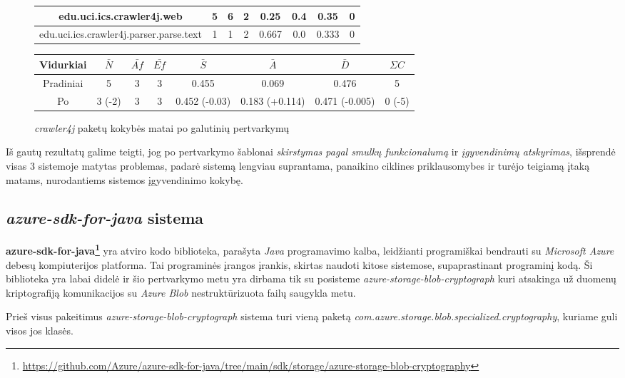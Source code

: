 \begin{figure}[H]
\begin{center}
\begin{tabular}{|c|c|c|c|c|c|c|c|}
        \hline
        edu.uci.ics.crawler4j.web & 5 & 6 & 2 & 0.25 & 0.4 & 0.35 & 0 \\
        \hline
        edu.uci.ics.crawler4j.parser.parse.text & 1 & 1 & 2 & 0.667 & 0.0 & 0.333 & 0 \\
        \hline
    \end{tabular}
    \begin{tabular}{|c|c|c|c|c|c|c|c|}
        \hline
        Vidurkiai & $\bar{N}$ & $\bar{Af}$ & $\bar{Ef}$ & $\bar{S}$ & $\bar{A}$ & $\bar{D}$ & $\Sigma C$ \\ [0.5ex]
        \hline\hline
        Pradiniai & 5 & 3 & 3 & 0.455 & 0.069 & 0.476 & 5\\
        \hline
        Po & \cellcolor{green!25} 3 (-2) & 3 & 3 & \cellcolor{green!24} 0.452 (-0.03) & \cellcolor{green!25} 0.183 (+0.114) & \cellcolor{green!25} 0.471 (-0.005) & \cellcolor{green!25} 0 (-5)\\
        \hline
    \end{tabular}
\end{center}
\caption{\textit{crawler4j} paketų kokybės matai po galutinių pertvarkymų}
\label{table:abstrs}
\end{figure}
Iš gautų rezultatų galime teigti, jog po pertvarkymo šablonai \textit{skirstymas pagal smulkų funkcionalumą} ir \textit{įgyvendinimų atskyrimas}, išsprendė visas 3 sistemoje matytas problemas,
padarė sistemą lengviau suprantama, panaikino ciklines priklausomybes ir turėjo teigiamą įtaką matams, nurodantiems
sistemos įgyvendinimo kokybę.


\subsection{\textit{azure-sdk-for-java} sistema}
\textbf{azure-sdk-for-java\footnote{\url{https://github.com/Azure/azure-sdk-for-java/tree/main/sdk/storage/azure-storage-blob-cryptography}}} yra atviro kodo
biblioteka, parašyta \textit{Java} programavimo kalba, leidžianti programiškai bendrauti su \textit{Microsoft Azure} debesų kompiuterijos platforma.
Tai programinės įrangos įrankis, skirtas naudoti kitose sistemose, supaprastinant programinį kodą.
Ši biblioteka yra labai didelė ir šio pertvarkymo metu yra dirbama tik su posisteme \textit{azure-storage-blob-cryptograph} kuri atsakinga už duomenų kriptografiją
komunikacijos su \textit{Azure Blob} nestruktūrizuota failų saugykla metu.

Prieš visus pakeitimus \textit{azure-storage-blob-cryptograph} sistema turi vieną paketą \textit{com.azure.storage.blob.specialized.cryptography}, kuriame guli visos jos klasės.

